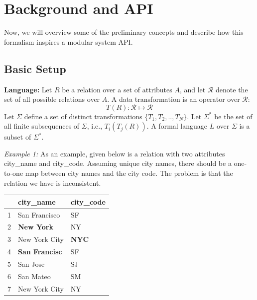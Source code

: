 
\section{Background and API}
Now, we will overview some of the preliminary concepts and describe how this formalism inspires a modular system API.

\subsection{Basic Setup}
\vspace{0.25em} \noindent \textbf{Language: } Let $R$ be a relation over a set of attributes $A$, and let $\mathcal{R}$ denote the set of all possible relations over $A$.
A data transformation is an operator over $\mathcal{R}$: 
\[T(R): \mathcal{R} \mapsto  \mathcal{R}\]
Let $\Sigma$ define a set of distinct transformations $\{T_1, T_2,..,T_N\}$.
Let $\Sigma^*$ be the set of all finite subsequences of $\Sigma$, i.e., $T_i(T_j(R))$.
A formal language $L$ over  $\Sigma$ is a subset of $\Sigma^*$.

\vspace{0.5em} \noindent \emph{Example 1: } As an example, given below is a relation with two attributes \textsf{city\_name} and \textsf{city\_code}. 
Assuming unique city names, there should be a one-to-one map between city names and the city code. The problem is that the relation we have is inconsistent.

\begin{table}[ht!]
\centering
\label{my-label}
\begin{tabular}{|l|l|l|}
\hline
\rowcolor[HTML]{000000} 
& {\color[HTML]{FFFFFF} city\_name}            & {\color[HTML]{FFFFFF} city\_code}   \\ \hline
1 & San Francisco                                & SF                                  \\ \hline
2& {\color[HTML]{FE0000} \textbf{New York}}     & NY                                  \\ \hline
3 & New York City                                & {\color[HTML]{FE0000} \textbf{NYC}} \\ \hline
4 & {\color[HTML]{FE0000} \textbf{San Francisc}} & SF                                  \\ \hline
5 & San Jose                                     & SJ                                  \\ \hline
6 & San Mateo                                    & SM                                  \\ \hline
7 & New York City                                & NY                                  \\ \hline
\end{tabular}
\end{table}

